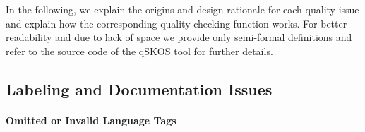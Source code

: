 In the following, we explain the origins and design rationale for each quality issue and explain how the corresponding quality checking function works. For better readability and due to lack of space we provide only semi-formal definitions and refer to the source code of the qSKOS tool for further details.



\subsection{Labeling and Documentation Issues}

\paragraph{Omitted or Invalid Language Tags}

